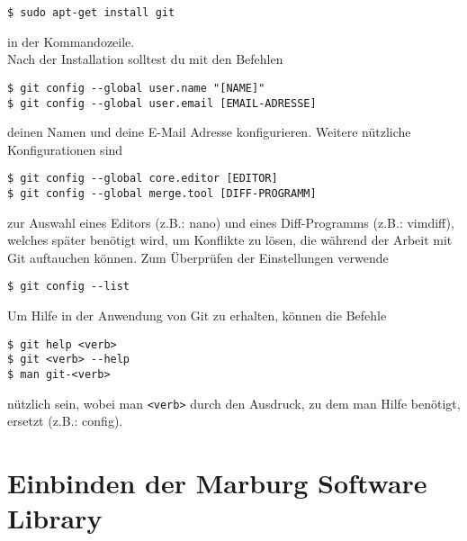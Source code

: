\documentclass[a4paper,11pt,german]{article}
\newenvironment{bem}[1][Bemerkung]{\begin{trivlist}
\item[\hskip \labelsep {\bfseries #1}]}{\end{trivlist}}
\begin{document}
\begin{verbatim}
$ sudo apt-get install git
\end{verbatim}
in der Kommandozeile.\\
Nach der Installation solltest du mit den Befehlen
\begin{verbatim}
$ git config --global user.name "[NAME]"
$ git config --global user.email [EMAIL-ADRESSE]
\end{verbatim}
deinen Namen und deine E-Mail Adresse konfigurieren.
Weitere nützliche Konfigurationen sind
\begin{verbatim}
$ git config --global core.editor [EDITOR]
$ git config --global merge.tool [DIFF-PROGRAMM]
\end{verbatim}
zur Auswahl eines Editors (z.B.: nano) und eines Diff-Programms (z.B.: vimdiff), welches später benötigt wird, um Konflikte zu lösen, die während der Arbeit mit Git auftauchen können.
Zum Überprüfen der Einstellungen verwende
\begin{verbatim}
$ git config --list
\end{verbatim}
\begin{bem}
Um Hilfe in der Anwendung von Git zu erhalten, können die Befehle
\begin{verbatim}
$ git help <verb>
$ git <verb> --help
$ man git-<verb>
\end{verbatim}
nützlich sein, wobei man \verb|<verb>| durch den Ausdruck, zu dem man Hilfe benötigt, ersetzt (z.B.: config).
\end{bem}


\section{Einbinden der Marburg Software Library}
\end{document}
